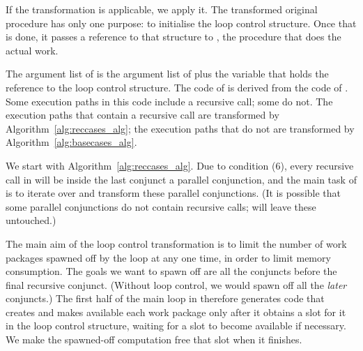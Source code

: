 If the transformation is applicable, we apply it.
The transformed original procedure has only one purpose:
to initialise the loop control structure.
Once that is done, it passes a reference to that structure to ,
the procedure that does the actual work.

The argument list of 
is the argument list of 
plus the \LC variable that holds the reference to the loop control structure.
The code of  is derived from the code of .
Some execution paths in this code include a recursive call; some do not.
The execution paths that contain a recursive call
are transformed by Algorithm~\ref{alg:reccases_alg};
the execution paths that do not
are transformed by Algorithm~\ref{alg:basecases_alg}.

We start with Algorithm~\ref{alg:reccases_alg}.
Due to condition (6),
every recursive call in 
will be inside the last conjunct a parallel conjunction,
and the main task of \createloopgoal
is to iterate over and transform these parallel conjunctions.
(It is possible that some parallel conjunctions do not contain recursive calls;
\createloopgoal will leave these untouched.)


The main aim of the loop control transformation is
to limit the number of work packages spawned off by the loop at any one time,
in order to limit memory consumption.
The goals we want to spawn off
are all the conjuncts before the final recursive conjunct.
(Without loop control, we would spawn off all the \emph{later} conjuncts.)
The first half of the main loop in \createloopgoal
therefore generates code that creates and makes available each work package
only after it obtains a slot for it in the loop control structure,
waiting for a slot to become available if necessary.
We make the spawned-off computation free that slot when it finishes.

